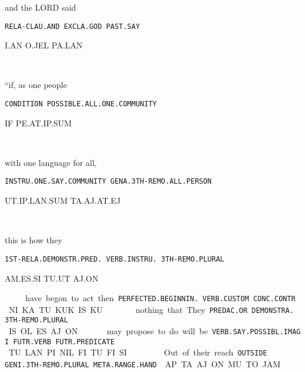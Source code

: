 {and 			the LORD            said 

{\tt RELA-CLAU.AND              EXCLA.GOD	PAST.SAY }

I.AN			O.JEL		PA.LAN 

\Atlani\an ~ \Atlano\jel~\pa\lan
\drie 

“if, 			as one people 		

{\tt CONDITION	POSSIBLE.ALL.ONE.COMMUNITY		 }

IF			PE.AT.IP.SUM				 

\Atlanif~\pe\at\ip\Atlansum
\drie 

 

with one language 		for all, 

{\tt INSTRU.ONE.SAY.COMMUNITY	GENA.3TH-REMO.ALL.PERSON	 }

UT.IP.LAN.SUM			TA.AJ.AT.EJ 

\ut\ip\lan\Atlansum~\ta\aj\at\ej
\drie 

 

this is 				how       	they  

{\tt 1ST-RELA.DEMONSTR.PRED.	VERB.INSTRU.    3TH-REMO.PLURAL }

AM.ES.SI			TU.UT		AJ.ON 

\am\es\si~\tu\ut~\aj\on
  
\drie 

have begon 			to act		then 		 

{\tt PERFECTED.BEGINNIN.                 VERB.CUSTOM	CONC.CONTR	 }

NI.KA				TU.KUK		IS.KU                     

\Atlanni\ka~\tu\kuk~\is\ku
\drie 


nothing 	that		They 	 

{\tt PREDAC.OR	DEMONSTRA.	3TH-REMO.PLURAL }

IS.OL		ES		AJ.ON	 

\is\ol~\es~\aj\on
\drie 

 

may propose			to do		will be 

{\tt VERB.SAY.POSSIBL.IMAGI	FUTR.VERB	FUTR.PREDICATE }

TU.LAN.PI.NIL		               FI.TU		FI.SI 

\tu\lan\Atlanpi\Atlannil~\Atlanfi\tu~\Atlanfi\si
\drie 

  

Out 		of their 				reach 

{\tt OUTSIDE	GENI.3TH-REMO.PLURAL	META.RANGE.HAND }

AP		TA.AJ.ON			MU.TO.JAM 

}

